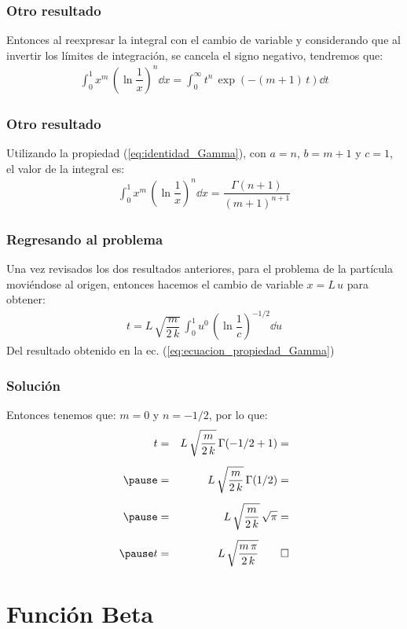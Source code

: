 \begin{frame}
\frametitle{Otro resultado}
Entonces al reexpresar la integral con el cambio de variable y considerando que al invertir los límites de integración, se cancela el signo negativo, tendremos que:
\begin{align*}
\int_{0}^{1} x^{m} \, \left( \ln \dfrac{1}{x} \right)^{n} \dd{x} = \int_{0}^{\infty} t^{n} \, \exp(-(m+1) \, t) \dd{t}
\end{align*}
\end{frame}
\begin{frame}
\frametitle{Otro resultado}
Utilizando la propiedad (\ref{eq:identidad_Gamma}), con $a = n$, $b = m + 1$ y $c = 1$, el valor de la integral es:
\begin{align}
\int_{0}^{1} x^{m} \, \left( \ln \dfrac{1}{x} \right)^{n} \dd{x} = \dfrac{\Gamma (n + 1)}{(m + 1)^{n+1}}
\label{eq:ecuacion_propiedad_Gamma}
\end{align}
\end{frame}
\begin{frame}
\frametitle{Regresando al problema}
Una vez revisados los dos resultados anteriores, para el problema de la partícula moviéndose al origen, entonces hacemos el cambio de variable $x = L \, u$ para obtener:
\begin{align*}
t = L \, \sqrt{\dfrac{m}{2 \, k}} \, \int_{0}^{1} u^{0} \, \left( \ln \dfrac{1}{c} \right)^{-1/2} \dd{u}
\end{align*}
\pause
Del resultado obtenido en la ec. (\ref{eq:ecuacion_propiedad_Gamma})
\end{frame}
\begin{frame}
\frametitle{Solución}
Entonces tenemos que: $m = 0$ y $n = -1/2$, por lo que:
\fontsize{12}{12}\selectfont
\begin{eqnarray*}
t &=& L \, \sqrt{\dfrac{m}{2 \, k}} \, \Gamma(-1/2 + 1) = \\[0.5em] \pause
&=& L \, \sqrt{\dfrac{m}{2 \, k}} \, \Gamma(1/2) = \\[0.5em] \pause
&=& L \, \sqrt{\dfrac{m}{2 \, k}} \, \sqrt{\pi} = \\[0.5em] \pause
t &=& L \, \sqrt{\dfrac{m \, \pi}{2 \, k}} \qed
\end{eqnarray*}
\end{frame}

\section{Función Beta}
